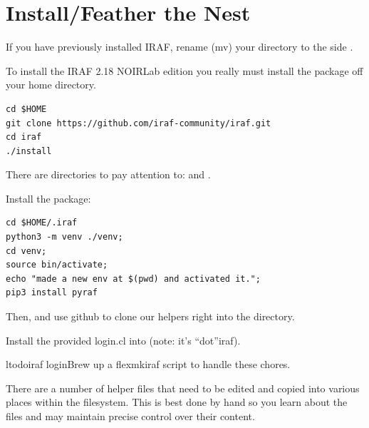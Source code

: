 
\renewcommand{\footerfilename}{FeatherNest.tex}


\section{Install/Feather the Nest} \label{sec:InstallFeatherNest}

If you have previously installed IRAF, rename (mv) your directory to
the side .

To install the IRAF 2.18 NOIRLab edition  
you really must install the package off your home directory.

\begingroup \fontsize{10pt}{10pt}
\selectfont
\begin{verbatim} 
cd $HOME
git clone https://github.com/iraf-community/iraf.git
cd iraf
./install
\end{verbatim}
\endgroup

There are  directories to pay attention to:
 and .

Install the  package:

\begingroup \fontsize{10pt}{10pt}
\selectfont
\begin{verbatim} 
cd $HOME/.iraf
python3 -m venv ./venv; 
cd venv;
source bin/activate;
echo "made a new env at $(pwd) and activated it.";
pip3 install pyraf
\end{verbatim}
\endgroup


Then,  and use github to clone our helpers right into
the   directory.

Install the provided login.cl into  (note: it's ``dot''iraf).

ltodo{iraf login}{Brew up a flexmkiraf script to handle these chores.}

There are a number of helper files that need to be edited and copied
into various places within the filesystem. This is best done by hand
so you learn about the files and may maintain precise control over
their content.

